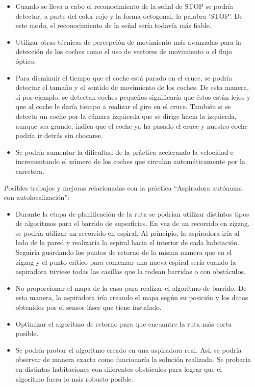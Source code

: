 	\begin{itemize}
	\item Cuando se lleva a cabo el reconocimiento de la señal de STOP se podría detectar, a parte del color rojo y la forma octogonal, la palabra 'STOP'. De este modo, el reconocimiento de la señal sería todavía más fiable.
	
	\item Utilizar otras técnicas de percepción de movimiento más avanzadas para la detección de los coches como el uso de vectores de movimiento o el flujo óptico.
	
	\item Para disminuir el tiempo que el coche está parado en el cruce, se podría detectar el tamaño y el sentido de movimiento de los coches. De esta manera, si por ejemplo, se detectan coches pequeños significaría que éstos están lejos y que al coche le daría tiempo a realizar el giro en el cruce. También si se detecta un coche por la cámara izquierda que se dirige hacia la izquierda, aunque sea grande, indica que el coche ya ha pasado el cruce y nuestro coche podría ir detrás sin chocarse.
	
	\item Se podría aumentar la dificultad de la práctica acelerando la velocidad e incrementando el número de los coches que circulan automáticamente por la carretera.
	\end{itemize}
	
Posibles trabajos y mejoras relacionadas con la práctica ``Aspiradora autónoma con autolocalización'':

	\begin{itemize}
	\item Durante la etapa de planificación de la ruta se podrían utilizar distintos tipos de algoritmos para el barrido de superficies. En vez de un recorrido en zigzag, se podría utilizar un recorrido en espiral. Al principio, la aspiradora iría al lado de la pared y realizaría la espiral hacia el interior de cada habitación. Seguiría guardando los puntos de retorno de la misma manera que en el zigzag y el punto crítico para comenzar una nueva espiral sería cuando la aspiradora tuviese todas las casillas que la rodean barridas o con obstáculos.
	
	\item No proporcionar el mapa de la casa para realizar el algoritmo de barrido. De esta manera, la aspiradora iría creando el mapa según su posición y los datos obtenidos por el sensor láser que tiene instalado.
	
	\item Optimizar el algoritmo de retorno para que encuantre la ruta más corta posible.
	
	\item Se podría probar el algoritmo creado en una aspiradora real. Así, se podría observar de manera exacta como funcionaría la solución realizada. Se probaría en distintas habitaciones con diferentes obstáculos para lograr que el algoritmo fuera lo más robusto posible. 
	\end{itemize}



